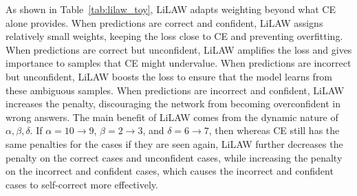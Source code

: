 \documentclass{article}
\theoremstyle{plain}
\theoremstyle{definition}
\theoremstyle{remark}
\begin{document}
\begin{table}[ht] \centering {}
\caption{Comparison of cross-entropy (CE) and LiLAW-weighted loss under two $\alpha,\beta,\delta$ settings.}
\label{tab:lilaw_toy}
\end{table}
\vspace{-1em}
As shown in Table~\ref{tab:lilaw_toy}, LiLAW adapts weighting beyond what CE alone provides. When predictions are correct and confident, LiLAW assigns relatively small weights, keeping the loss close to CE and preventing overfitting. When predictions are correct but unconfident, LiLAW amplifies the loss and gives importance to samples that CE might undervalue. When predictions are incorrect but unconfident, LiLAW boosts the loss to ensure that the model learns from these ambiguous samples. When predictions are incorrect and confident, LiLAW increases the penalty, discouraging the network from becoming overconfident in wrong answers. The main benefit of LiLAW comes from the dynamic nature of $\alpha,\beta,\delta$. If $\alpha=10\rightarrow 9$, $\beta=2 \rightarrow 3$, and $\delta=6\rightarrow 7$, then whereas CE still has the same penalties for the cases if they are seen again, LiLAW further decreases the penalty on the correct cases and unconfident cases, while increasing the penalty on the incorrect and confident cases, which causes the incorrect and confident cases to self-correct more effectively.
\end{document}
